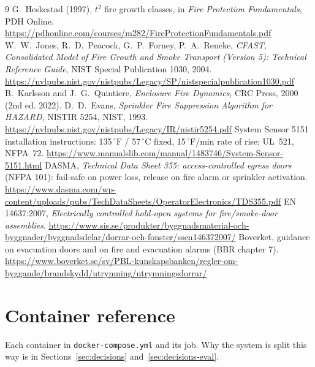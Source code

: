 \documentclass[11pt]{article}
\newcommand{\code}[1]{\texttt{#1}}
\begin{document}
\begin{thebibliography}{9}
 G.~Heskestad (1997), $t^2$ fire growth classes, in \emph{Fire Protection Fundamentals}, PDH Online. \url{https://pdhonline.com/courses/m282/FireProtectionFundamentals.pdf}
 W.~W.~Jones, R.~D.~Peacock, G.~P.~Forney, P.~A.~Reneke, \emph{CFAST, Consolidated Model of Fire Growth and Smoke Transport (Version 5): Technical Reference Guide}, NIST Special Publication 1030, 2004. \url{https://nvlpubs.nist.gov/nistpubs/Legacy/SP/nistspecialpublication1030.pdf}
 B.~Karlsson and J.~G.~Quintiere, \emph{Enclosure Fire Dynamics}, CRC Press, 2000 (2nd ed. 2022).
 D.~D.~Evans, \emph{Sprinkler Fire Suppression Algorithm for HAZARD}, NISTIR 5254, NIST, 1993. \url{https://nvlpubs.nist.gov/nistpubs/Legacy/IR/nistir5254.pdf}
 System Sensor 5151 installation instructions: 135\,$^\circ$F / 57\,$^\circ$C fixed, 15\,$^\circ$F/min rate of rise; UL~521, NFPA~72. \url{https://www.manualslib.com/manual/1483746/System-Sensor-5151.html}
 DASMA, \emph{Technical Data Sheet 355: access-controlled egress doors} (NFPA 101): fail-safe on power loss, release on fire alarm or sprinkler activation. \url{https://www.dasma.com/wp-content/uploads/pubs/TechDataSheets/OperatorElectronics/TDS355.pdf}
 EN 14637:2007, \emph{Electrically controlled hold-open systems for fire/smoke-door assemblies}. \url{https://www.sis.se/produkter/byggnadsmaterial-och-byggnader/byggnadsdelar/dorrar-och-fonster/ssen146372007/}
 Boverket, guidance on evacuation doors and on fire and evacuation alarms (BBR chapter 7). \url{https://www.boverket.se/sv/PBL-kunskapsbanken/regler-om-byggande/brandskydd/utrymning/utrymningsdorrar/}
\end{thebibliography}

\clearpage
\appendix
\section{Container reference}\label{app:containers}
Each container in \code{docker-compose.yml} and its job. Why the system is split this way is in Sections~\ref{sec:decisions} and~\ref{sec:decisions-eval}.
\end{document}

